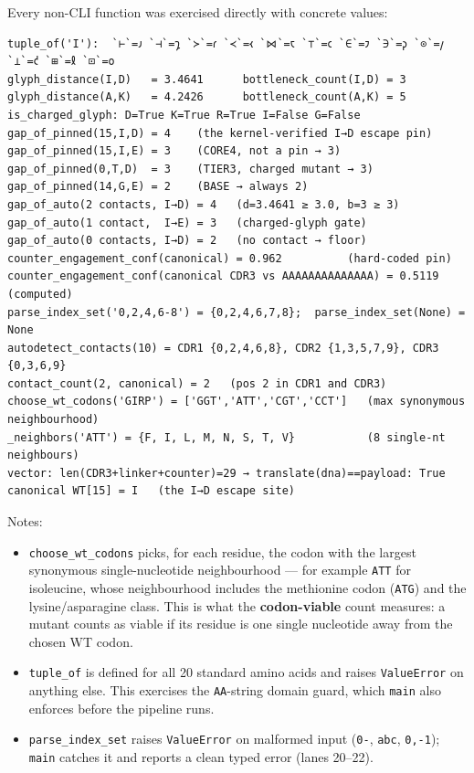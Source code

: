 Every non-CLI function was exercised directly with concrete values:

\begin{verbatim}
tuple_of('I'):  `⊢`=𐑨 `⊣`=𐑡 `≻`=𐑩 `≺`=𐑬 `⋈`=𐑱 `⊤`=𐑤 `∈`=𐑲 `∋`=𐑜 `⊙`=𐑢 `⊥`=𐑒 `⊞`=𐑙 `⊡`=𐑴
glyph_distance(I,D)   = 3.4641      bottleneck_count(I,D) = 3
glyph_distance(A,K)   = 4.2426      bottleneck_count(A,K) = 5
is_charged_glyph: D=True K=True R=True I=False G=False
gap_of_pinned(15,I,D) = 4    (the kernel-verified I→D escape pin)
gap_of_pinned(15,I,E) = 3    (CORE4, not a pin → 3)
gap_of_pinned(0,T,D)  = 3    (TIER3, charged mutant → 3)
gap_of_pinned(14,G,E) = 2    (BASE → always 2)
gap_of_auto(2 contacts, I→D) = 4   (d=3.4641 ≥ 3.0, b=3 ≥ 3)
gap_of_auto(1 contact,  I→E) = 3   (charged-glyph gate)
gap_of_auto(0 contacts, I→D) = 2   (no contact → floor)
counter_engagement_conf(canonical) = 0.962          (hard-coded pin)
counter_engagement_conf(canonical CDR3 vs AAAAAAAAAAAAAA) = 0.5119  (computed)
parse_index_set('0,2,4,6-8') = {0,2,4,6,7,8};  parse_index_set(None) = None
autodetect_contacts(10) = CDR1 {0,2,4,6,8}, CDR2 {1,3,5,7,9}, CDR3 {0,3,6,9}
contact_count(2, canonical) = 2   (pos 2 in CDR1 and CDR3)
choose_wt_codons('GIRP') = ['GGT','ATT','CGT','CCT']   (max synonymous neighbourhood)
_neighbors('ATT') = {F, I, L, M, N, S, T, V}           (8 single-nt neighbours)
vector: len(CDR3+linker+counter)=29 → translate(dna)==payload: True
canonical WT[15] = I   (the I→D escape site)
\end{verbatim}

Notes:

\begin{itemize}
\tightlist
\item
  \texttt{choose\_wt\_codons} picks, for each residue, the codon with
  the largest synonymous single-nucleotide neighbourhood --- for example
  \texttt{ATT} for isoleucine, whose neighbourhood includes the
  methionine codon (\texttt{ATG}) and the lysine/asparagine class. This
  is what the \textbf{codon-viable} count measures: a mutant counts as
  viable if its residue is one single nucleotide away from the chosen WT
  codon.
\item
  \texttt{tuple\_of} is defined for all 20 standard amino acids and
  raises \texttt{ValueError} on anything else. This exercises the
  \texttt{AA}-string domain guard, which \texttt{main} also enforces
  before the pipeline runs.
\item
  \texttt{parse\_index\_set} raises \texttt{ValueError} on malformed
  input (\texttt{\textquotesingle{}0-\textquotesingle{}},
  \texttt{\textquotesingle{}abc\textquotesingle{}},
  \texttt{\textquotesingle{}0,-1\textquotesingle{}}); \texttt{main}
  catches it and reports a clean typed error (lanes 20--22).
\end{itemize}


